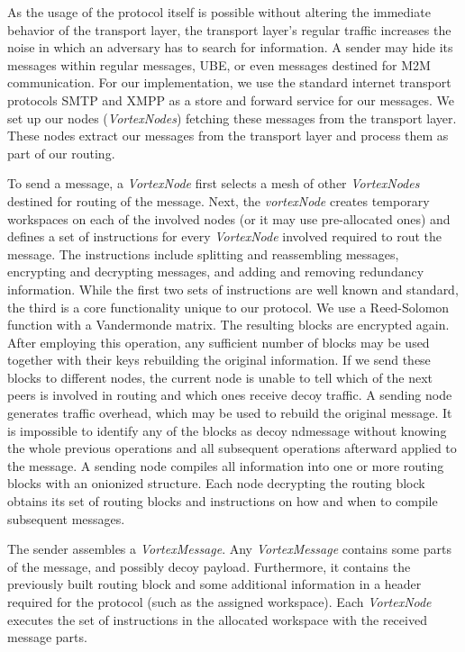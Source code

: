 \documentclass[acmsmall, screen]{acmart}
\begin{document}
As the usage of the protocol itself is possible without altering the immediate behavior of the transport layer, the transport layer's regular traffic increases the noise in which an adversary has to search for information. A sender may hide its messages within regular messages, UBE, or even messages destined for M2M communication. For our implementation, we use the standard internet transport protocols SMTP and XMPP as a store and forward service for our messages. We set up our nodes (\emph{VortexNodes}) fetching these messages from the transport layer. These nodes extract our messages from the transport layer and process them as part of our routing. 

To send a message, a \emph{VortexNode} first selects a mesh of other \emph{VortexNodes} destined for routing of the message. Next, the \emph{vortexNode} creates temporary workspaces on each of the involved nodes (or it may use pre-allocated ones) and defines a set of instructions for every \emph{VortexNode} involved required to rout the message. The instructions include splitting and reassembling messages, encrypting and decrypting messages, and adding and removing redundancy information. While the first two sets of instructions are well known and standard, the third is a core functionality unique to our protocol. We use a Reed-Solomon function with a Vandermonde matrix. The resulting blocks are encrypted again. After employing this operation, any sufficient number of blocks may be used together with their keys rebuilding the original information. If we send these blocks to different nodes, the current node is unable to tell which of the next peers is involved in routing and which ones receive decoy traffic. A sending node generates traffic overhead, which may be used to rebuild the original message. It is impossible to identify any of the blocks as decoy ndmessage without knowing the whole previous operations and all subsequent operations afterward applied to the message. A sending node compiles all information into one or more routing blocks with an onionized structure. Each node decrypting the routing block obtains its set of routing blocks and instructions on how and when to compile subsequent messages. 

The sender assembles a \emph{VortexMessage}. Any \emph{VortexMessage} contains some parts of the message, and possibly decoy payload. Furthermore, it contains the previously built routing block and some additional information in a header required for the protocol (such as the assigned workspace). Each \emph{VortexNode} executes the set of instructions in the allocated workspace with the received message parts. 
\end{document}
